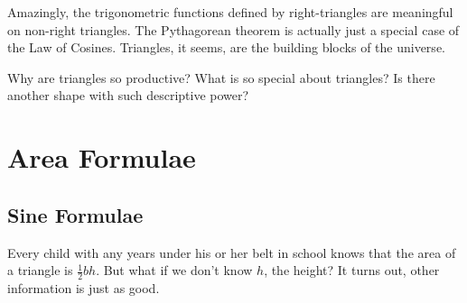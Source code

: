 

Amazingly, the trigonometric functions defined by right-triangles are
meaningful on non-right triangles.  The Pythagorean theorem is actually
just a special case of the Law of Cosines.  Triangles, it seems, are the
building blocks of the universe.

Why are triangles so productive?  What is so special about triangles?
Is there another shape with such descriptive power?

\newpage
\chapterminitoc


\newpage
\section{Area Formulae}
\noindent{}
\subsection{Sine Formulae}
Every child with any years under his or her belt in school knows that the area of a triangle is
$\frac{1}{2}bh$.  But what if we don't know $h$, the height?  It turns out, other information
is just as good.

